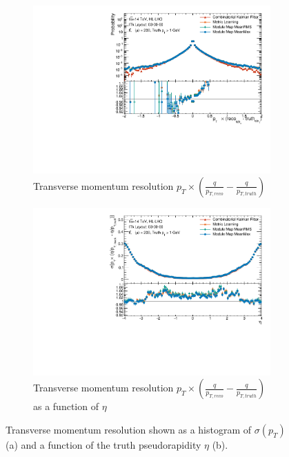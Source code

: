 \begin{figure}[h!]
\centering
\begin{subfigure}[b]{0.65\textwidth}
    \centering
    \includegraphics[width=\textwidth]{figures/ckf-gnn/Matched/Resolutions/Primary/res_ptqopt.pdf}
    \caption{Transverse momentum resolution $p_T  \times \left ( \frac{q}{p_{T, reco}} - \frac{q}{p_{T, truth}} \right)$}
    \label{subfig:res-pt-hist}
\end{subfigure}
\begin{subfigure}[b]{0.65\textwidth}
    \centering
    \includegraphics[width=\textwidth]{figures/ckf-gnn/Matched/Resolutions/Primary/resolution_vs_eta_ptqopt.pdf}
    \caption{Transverse momentum resolution $p_T \times \left ( \frac{q}{p_{T, reco}} - \frac{q}{p_{T, truth}} \right)$ as a function of $\eta$}
    \label{subfig:res-pt-eta}
\end{subfigure}
    \caption{Transverse momentum resolution shown as a histogram of $\sigma(p_T)$ (a) and a function of the truth pseudorapidity $\eta$ (b). }
    \label{fig:res-pt}
\end{figure}

